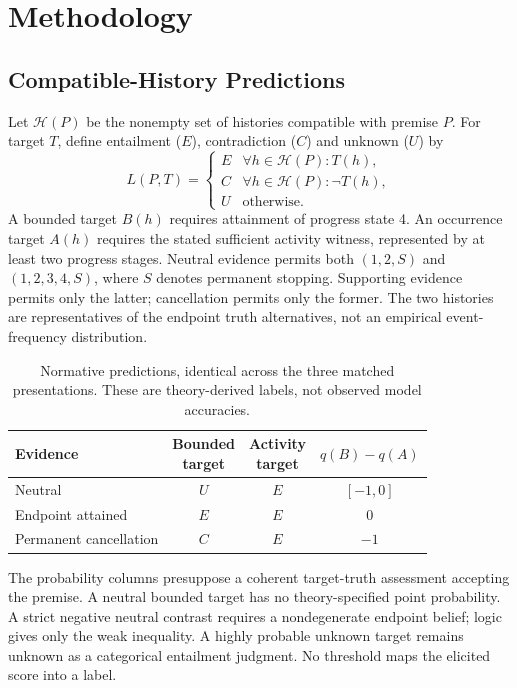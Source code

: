 \documentclass[sigconf,anonymous,review]{acmart}
\begin{document}
\section{Methodology}
\subsection{Compatible-History Predictions}
Let $\mathcal{H}(P)$ be the nonempty set of histories compatible with premise $P$. For target $T$, define entailment ($E$), contradiction ($C$) and unknown ($U$) by
\begin{equation}
 L(P,T)=\begin{cases}
 E & \forall h\in\mathcal{H}(P):T(h),\\
 C & \forall h\in\mathcal{H}(P):\neg T(h),\\
 U & \text{otherwise}.
 \end{cases}
\end{equation}
A bounded target $B(h)$ requires attainment of progress state 4. An occurrence target $A(h)$ requires the stated sufficient activity witness, represented by at least two progress stages. Neutral evidence permits both $(1,2,S)$ and $(1,2,3,4,S)$, where $S$ denotes permanent stopping. Supporting evidence permits only the latter; cancellation permits only the former. The two histories are representatives of the endpoint truth alternatives, not an empirical event-frequency distribution.

\begin{table}[t]
\centering
\caption{Normative predictions, identical across the three matched presentations. These are theory-derived labels, not observed model accuracies.}
\label{tab:theory}
\setlength{\tabcolsep}{3pt}
\begin{tabular}{lccc}
\toprule
Evidence & \shortstack{Bounded\\target} & \shortstack{Activity\\target} & $q(B)-q(A)$\\
\midrule
Neutral & $U$ & $E$ & $[-1,0]$\\
Endpoint attained & $E$ & $E$ & $0$\\
Permanent cancellation & $C$ & $E$ & $-1$\\
\bottomrule
\end{tabular}
\end{table}

The probability columns presuppose a coherent target-truth assessment accepting the premise. A neutral bounded target has no theory-specified point probability. A strict negative neutral contrast requires a nondegenerate endpoint belief; logic gives only the weak inequality. A highly probable unknown target remains unknown as a categorical entailment judgment. No threshold maps the elicited score into a label.
\end{document}

